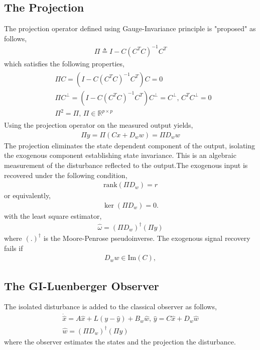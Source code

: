 \subsection{The Projection}
The projection operator defined using Gauge-Invariance principle is "proposed" as follows,
\begin{gather}
    \Pi\triangleq I-C(C^TC)^{-1}C^T
\end{gather}
which satisfies the following properties,
\begin{gather}
\begin{split}
    &\Pi C= (I-C(C^TC)^{-1}C^T)C=0\\
    &\Pi C^\perp=(I-C(C^TC)^{-1}C^T)C^\perp=C^\perp,\,C^TC^\perp=0\\
    &\Pi^2=\Pi,\,\Pi\in\mathbb{R}^{p\times p}
\end{split}
\end{gather}
Using the projection operator on the measured output yields,
\begin{gather}
    \Pi y=\Pi(C x+D_w w)=\Pi D_w w
\end{gather}
The projection eliminates the state dependent component of the output, isolating the exogenous component establishing state invariance. This is an algebraic measurement of the disturbance reflected to the output.The exogenous input is recovered under the following condition,
\begin{gather}
    \mathrm{rank}(\Pi D_w)=r
\end{gather}
or equivalently,
\begin{gather}
\ker(\Pi D_w) = {0}.
\end{gather}
with the least square estimator,
\begin{gather}
    \hat{\omega}=(\Pi D_w)^\dagger(\Pi y)
\end{gather}
where $(.)^\dagger$ is the Moore-Penrose pseudoinverse. The exogenous signal recovery fails if 
\begin{gather}
D_w w \in \mathrm{Im}(C),
\end{gather}
\subsection{The GI-Luenberger Observer}
The isolated disturbance is added to the classical observer as follows,
\begin{gather} 
    \dot{\hat{x}}=A \hat{x}+L(y-\hat{y})+B_w\hat{w},\,\hat{y}=C \hat{x}+D_w\hat{w}\\
    \hat{w}=(\Pi D_w)^\dagger(\Pi y)
\end{gather}
where the observer estimates the states and the projection the disturbance. 



